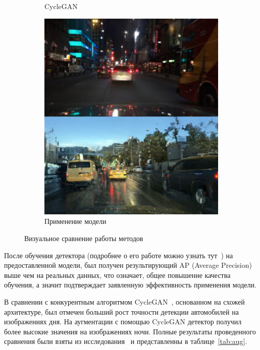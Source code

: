 \documentclass[11pt,a4paper]{extarticle}
\begin{document}
{\begin{figure}[ht]
\begin{subfigure}[ht]{0.32\textwidth}
					\caption{CycleGAN~\cite{CycleGAN}}
				\end{subfigure}
				\begin{subfigure}[ht]{0.32\textwidth}
					\includegraphics[width=\textwidth]{img/aug_model}
					\caption{Применение модели}
				\end{subfigure}
				\caption{Визуальное сравнение работы методов}
				\label{pic:aug_results}
			\end{figure}

			\noindent
			После обучения детектора (подробнее о его работе можно узнать тут~\cite{disser_aug}) на предоставленной модели, был получен результирующий AP (Average Precision) выше чем на реальных данных, что означает, общее повышение качества обучения, а значит подтверждает заявленную эффективность применения модели.
			
			В сравнении с конкурентным алгоритмом CycleGAN~\cite{CycleGAN}, основанном на схожей архитектуре, был отмечен больший рост точности детекции автомобилей на изображениях дня.
			На аугментации с помощью CycleGAN детектор получил более высокие значения на изображениях ночи.
			Полные результаты проведенного сравнения были взяты из исследования~\cite{disser_aug} и представленны в таблице~\ref{tab:aug}.

}
\end{document}
